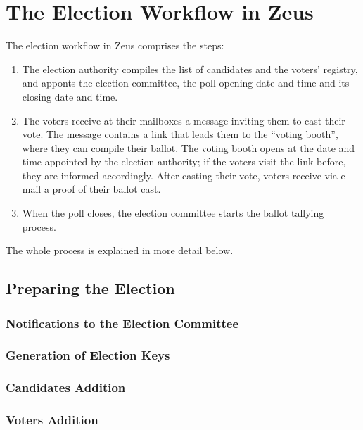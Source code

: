 \documentclass[runningheads,a4paper]{llncs}
\begin{document}
\section{The Election Workflow in Zeus}

The election workflow in Zeus comprises the steps:

\begin{enumerate}

\item The election authority compiles the list of candidates and the
  voters' registry, and apponts the election committee, the poll
  opening date and time and its closing date and time.

\item The voters receive at their mailboxes a message inviting them to
  cast their vote. The message contains a link that leads them to the
  ``voting booth'', where they can compile their ballot. The voting
  booth opens at the date and time appointed by the election
  authority; if the voters visit the link before, they are informed
  accordingly. After casting their vote, voters receive via e-mail a
  proof of their ballot cast.

\item When the poll closes, the election committee starts the ballot
  tallying process.

\end{enumerate}

The whole process is explained in more detail below.

\subsection{Preparing the Election}

\subsubsection{Notifications to the Election Committee}

\subsubsection{Generation of Election Keys}

\subsubsection{Candidates Addition}

\subsubsection{Voters Addition}
\end{document}
